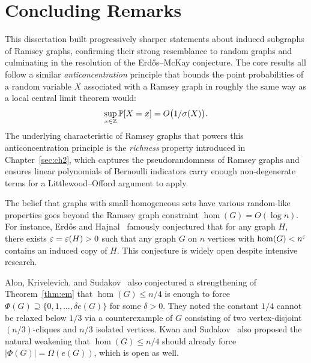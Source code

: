 \section{Concluding Remarks}
\label{sec:ch5}

This dissertation built progressively sharper statements about induced subgraphs of Ramsey graphs, confirming their strong resemblance to random graphs and culminating in the resolution of the Erd\H{o}s--McKay conjecture. The core results all follow a similar \textit{anticoncentration} principle that bounds the point probabilities of a random variable $X$ associated with a Ramsey graph in roughly the same way as a local central limit theorem would:
\[
\sup_{x \in \mathbb{Z}} \mathbb{P}[X = x] = O\bigl(1/\sigma(X)\bigr).
\]
The underlying characteristic of Ramsey graphs that powers this anticoncentration principle is the \textit{richness} property introduced in Chapter~\ref{sec:ch2}, which captures the pseudorandomness of Ramsey graphs and ensures linear polynomials of Bernoulli indicators carry enough non-degenerate terms for a Littlewood--Offord argument to apply.

The belief that graphs with small homogeneous sets have various random-like properties goes beyond the Ramsey graph constraint $\hom(G) = O(\log n)$. For instance, Erd\H{o}s and Hajnal~\cite{ERDOS198937} famously conjectured that for any graph $H$, there exists $\varepsilon = \varepsilon(H) > 0$ such that any graph $G$ on $n$ vertices with $\hom(G) < n^\varepsilon$ contains an induced copy of $H$. This conjecture is widely open despite intensive research. 

Alon, Krivelevich, and Sudakov~\cite{AlonKrivelevichSudakov2003} also conjectured a strengthening of Theorem~\ref{thm:em} that $\hom(G) \leq n/4$ is enough to force $\Phi(G) \supseteq \{0, 1, \ldots, \delta e(G)\}$ for some $\delta > 0$. They noted the constant $1/4$ cannot be relaxed below $1/3$ via a counterexample of $G$ consisting of two vertex-disjoint $(n/3)$-cliques and $n/3$ isolated vertices. Kwan and Sudakov~\cite{kwan2021ramseygraphsinducesubgraphs} also proposed the natural weakening that $\hom(G) \leq n/4$ should already force $|\Phi(G)| = \Omega(e(G))$, which is open as well.